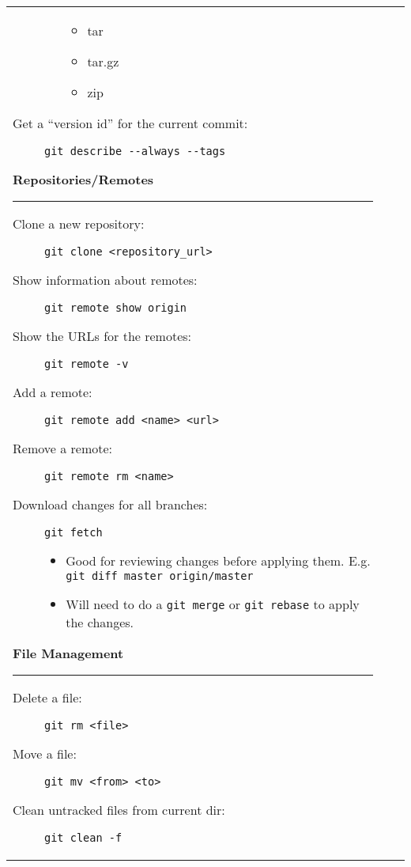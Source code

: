 \documentclass[landscape]{article}
\begin{document}
\begin{tabular*}{10.5in}{|p{2.9in}|p{2.9in}|p{2.9in}|}
\begin{flushleft}
\begin{description}
\begin{itemize}
                         \begin{itemize}
                             \item{tar}
                             \item{tar.gz}
                             \item{zip}
                         \end{itemize}
                 \end{itemize}
             \item[Get a ``version id'' for the current commit:]
                 {\verb!git describe --always --tags!}
        \end{description}
        \textbf{\large{Repositories/Remotes}}
        \rule{2.9in}{.5pt}
        \small
        \begin{description}
            \item[Clone a new repository:]
                {\verb!git clone <repository_url>!}
            \item[Show information about remotes:]
                {\verb!git remote show origin!}
            \item[Show the URLs for the remotes:]
                {\verb!git remote -v!}
            \item[Add a remote:]
                {\verb!git remote add <name> <url>!}
            \item[Remove a remote:]
                {\verb!git remote rm <name>!}
            \item[Download changes for all branches:]
                {\verb!git fetch!}
                \begin{itemize}
                    \item{Good for reviewing changes before applying them.
                          E.g. \verb!git diff master origin/master!}
                    \item{Will need to do a \verb!git merge! or
                        \verb!git rebase! to apply the changes.}
                \end{itemize}
        \end{description}
        \textbf{\large{File Management}}
        \rule{2.9in}{.5pt}
        \small
        \begin{description}
            \item[Delete a file:]
                {\verb!git rm <file>!}
            \item[Move a file:]
                {\verb!git mv <from> <to>!}
            \item[Clean untracked files from current dir:]
                {\verb!git clean -f!}
        \end{description}
    \end{flushleft}
\end{tabular*}
\end{document}
